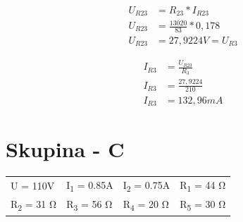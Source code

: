 \documentclass[12pt,a4paper]{article}
\begin{document}
    \begin{align*}
  	U_{R23} &= R_{23} * I_{R23} \\[0.5ex]
  	U_{R23} &= \frac{13020}{83} * 0,178 \\[0.5ex]
  	U_{R23} &= 27,9224 V = U_{R3}
  \end{align*}
  
      \begin{align*}
  	I_{R3} &= \frac{U_{R23}}{R_3} \\[0.5ex]
  	I_{R3} &= \frac{27,9224}{210} \\[0.5ex]
  	I_{R3} &= 132,96 mA
  \end{align*}
  
\newpage
\section{Skupina - C}
\begin{tabular}{ l l l l }
  U = 110V & I\textsubscript{1} = 0.85A & I\textsubscript{2} = 0.75A & R\textsubscript{1} = 44 \si{\ohm}   \\
  R\textsubscript{2} = 31 \si{\ohm} & R\textsubscript{3} = 56 \si{\ohm} & R\textsubscript{4} = 20 \si{\ohm} & R\textsubscript{5} = 30 \si{\ohm} \\
\end{tabular}
\end{document}
